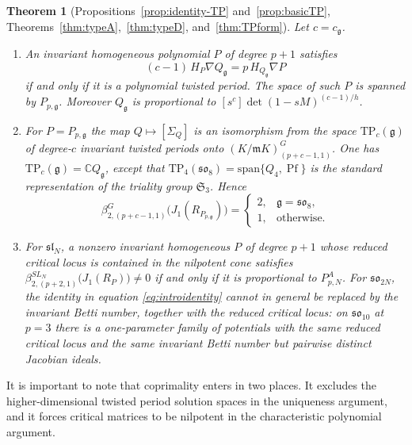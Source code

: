 \documentclass[10pt,reqno]{amsart}
\numberwithin{equation}{section}
\theoremstyle{plain}
\newtheorem{theorem}{Theorem}[section]
\theoremstyle{definition}
\newcommand{\Sym}{\mathfrak{S}}
\DeclareMathOperator{\Pf}{Pf}
\newcommand{\TP}{\mathrm{TP}}
\begin{document}
\begin{theorem}[Propositions~\ref{prop:identity-TP} and~\ref{prop:basicTP}, Theorems~\ref{thm:typeA},~\ref{thm:typeD}, and~\ref{thm:TPform}]\label{thm:mainC}
Let $c=c_\mathfrak{g}$.
\begin{enumerate}[label=(\roman*)]
\item An invariant homogeneous polynomial $P$ of degree $p+1$ satisfies
\begin{equation}\label{eq:introidentity}
	(c-1)\,H_P\nabla Q_\mathfrak{g}=p\,H_{Q_\mathfrak{g}}\nabla P
\end{equation}
if and only if it is a polynomial twisted period. The space of such $P$ is spanned by $P_{p,\mathfrak{g}}$. Moreover $Q_\mathfrak{g}$ is proportional to $[s^{c}]\det(1-sM)^{(c-1)/h}$.
\item For $P=P_{p,\mathfrak{g}}$ the map $Q\mapsto[\Sigma_Q]$ is an isomorphism from the space $\TP_c(\mathfrak{g})$ of degree-$c$ invariant twisted periods onto $(K/\mathfrak{m} K)^G_{(p+c-1,1)}$. One has $\TP_c(\mathfrak{g})=\mathbb{C} Q_\mathfrak{g}$, except that $\TP_4(\mathfrak{so}_8)=\mathrm{span}\{Q_4,\Pf\}$ is the standard representation of the triality group $\Sym_3$. Hence
\begin{equation}
	\beta^{G}_{2,(p+c-1,1)}\big(J_1(R_{P_{p,\mathfrak{g}}})\big)=
	\begin{cases}
		2,&\mathfrak{g}=\mathfrak{so}_8,\\ 
		1,&\text{otherwise.}
	\end{cases}
\end{equation}
\item For $\mathfrak{sl}_N$, a nonzero invariant homogeneous $P$ of degree $p+1$ whose reduced critical locus is contained in the nilpotent cone satisfies $\beta^{SL_N}_{2,(p+2,1)}\big(J_1(R_P)\big)\neq0$ if and only if it is proportional to $P^A_{p,N}$. For $\mathfrak{so}_{2N}$, the identity in equation \eqref{eq:introidentity} cannot in general be replaced by the invariant Betti number, together with the reduced critical locus: on $\mathfrak{so}_{10}$ at $p=3$ there is a one-parameter family of potentials with the same reduced critical locus and the same invariant Betti number but pairwise distinct Jacobian ideals.
\end{enumerate}
\end{theorem}
It is important to note that coprimality enters in two places. It excludes the higher-dimensional twisted period solution spaces in the uniqueness argument, and it forces critical matrices to be nilpotent in the characteristic polynomial argument.
\end{document}
